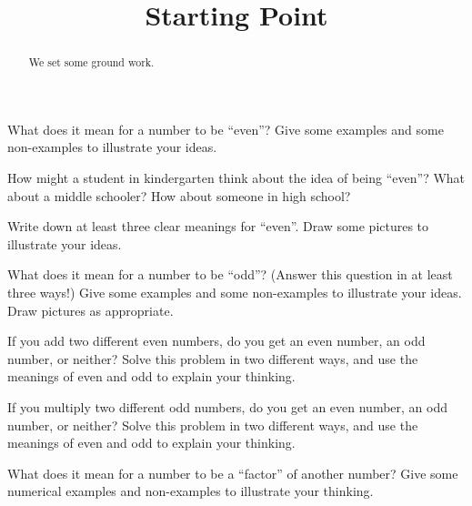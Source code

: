 \documentclass{ximera}
\title{Starting Point}
\begin{document}
\begin{abstract} We set some ground work. \end{abstract}
\maketitle



\begin{problem} What does it mean for a number to be ``even''? Give some examples and some non-examples to illustrate your ideas.
\end{problem}

\begin{problem} How might a student in kindergarten think about the idea of being ``even''? What about a middle schooler? How about someone in high school?
\end{problem}


\begin{problem} Write down at least three clear meanings for ``even''. Draw some pictures to illustrate your ideas.
\end{problem}

\begin{problem} What does it mean for a number to be ``odd''? (Answer this question in at least three ways!) Give some examples and some non-examples to illustrate your ideas. Draw pictures as appropriate.
\end{problem}


\newpage

\begin{problem}
If you add two different even numbers, do you get an even number, an odd number, or neither? Solve this problem in two different ways, and use the meanings of even and odd to explain your thinking.
\end{problem}


\begin{problem}
If you multiply two different odd numbers, do you get an even number, an odd number, or neither? Solve this problem in two different ways, and use the meanings of even and odd to explain your thinking.
\end{problem}


\newpage



\begin{problem} What does it mean for a number to be a ``factor'' of another number? Give some numerical examples and non-examples to illustrate your thinking.
\end{problem}
\end{document}
